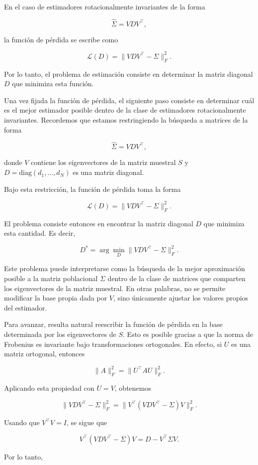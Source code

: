 \documentclass[letterpaper,12pt,oneside]{book}
\begin{document}
En el caso de estimadores rotacionalmente invariantes de la forma

\[
\hat{\Sigma}=VDV^\top,
\]

la función de pérdida se escribe como

\[
\mathcal{L}(D)
=
\|VDV^\top-\Sigma\|_F^2.
\]

Por lo tanto, el problema de estimación consiste en determinar la matriz diagonal $D$ que minimiza esta función.

Una vez fijada la función de pérdida, el siguiente paso consiste en determinar cuál es el mejor estimador posible dentro de la clase de estimadores rotacionalmente invariantes. Recordemos que estamos restringiendo la búsqueda a matrices de la forma

\[
\hat{\Sigma}=VDV^\top,
\]

donde $V$ contiene los eigenvectores de la matriz muestral $S$ y
$D=\mathrm{diag}(d_1,\dots,d_N)$ es una matriz diagonal.

Bajo esta restricción, la función de pérdida toma la forma

\[
\mathcal{L}(D)
=
\|VDV^\top-\Sigma\|_F^2.
\]

El problema consiste entonces en encontrar la matriz diagonal $D$ que minimiza esta cantidad. Es decir,

\[
D^*
=
\arg\min_D
\|VDV^\top-\Sigma\|_F^2.
\]

Este problema puede interpretarse como la búsqueda de la mejor aproximación posible a la matriz poblacional $\Sigma$ dentro de la clase de matrices que comparten los eigenvectores de la matriz muestral. En otras palabras, no se permite modificar la base propia dada por $V$, sino únicamente ajustar los valores propios del estimador.

Para avanzar, resulta natural reescribir la función de pérdida en la base determinada por los eigenvectores de $S$. Esto es posible gracias a que la norma de Frobenius es invariante bajo transformaciones ortogonales. En efecto, si $U$ es una matriz ortogonal, entonces

\[
\|A\|_F^2 = \|U^\top A U\|_F^2.
\]

Aplicando esta propiedad con $U=V$, obtenemos

\[
\|VDV^\top-\Sigma\|_F^2
=
\|V^\top(VDV^\top-\Sigma)V\|_F^2.
\]

Usando que $V^\top V=I$, se sigue que

\[
V^\top(VDV^\top-\Sigma)V
=
D - V^\top \Sigma V.
\]

Por lo tanto,
\end{document}
